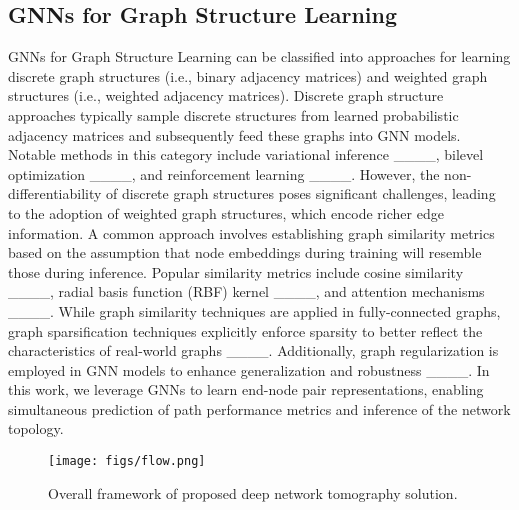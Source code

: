 \subsection{GNNs for Graph Structure Learning}
GNNs for Graph Structure Learning can be classified into approaches for learning discrete graph structures (i.e., binary adjacency matrices) and weighted graph structures (i.e., weighted adjacency matrices). Discrete graph structure approaches typically sample discrete structures from learned probabilistic adjacency matrices and subsequently feed these graphs into GNN models. Notable methods in this category include variational inference ____, bilevel optimization ____, and reinforcement learning ____. However, the non-differentiability of discrete graph structures poses significant challenges, leading to the adoption of weighted graph structures, which encode richer edge information. A common approach involves establishing graph similarity metrics based on the assumption that node embeddings during training will resemble those during inference. Popular similarity metrics include cosine similarity ____, radial basis function (RBF) kernel ____, and attention mechanisms ____. While graph similarity techniques are applied in fully-connected graphs, graph sparsification techniques explicitly enforce sparsity to better reflect the characteristics of real-world graphs ____. Additionally, graph regularization is employed in GNN models to enhance generalization and robustness ____. In this work, we leverage GNNs to learn end-node pair representations, enabling simultaneous prediction of path performance metrics and inference of the network topology.

\begin{figure*}[tb]
  \centering
  \texttt{[image: figs/flow.png]}
  \caption{Overall framework of proposed deep network tomography solution.}
  \label{Flow}
  \vspace{-7pt}
\end{figure*}